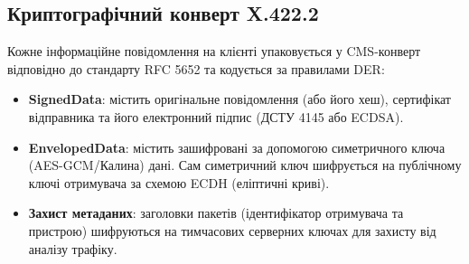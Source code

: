 \documentclass{article}
\begin{document}
\subsection{Криптографічний конверт X.422.2}
Кожне інформаційне повідомлення на клієнті упаковується у CMS-конверт відповідно до стандарту RFC 5652 та кодується за правилами DER:
\begin{itemize}
    \item \textbf{SignedData}: містить оригінальне повідомлення (або його хеш), сертифікат відправника та його електронний підпис (ДСТУ 4145 або ECDSA).
    \item \textbf{EnvelopedData}: містить зашифровані за допомогою симетричного ключа (AES-GCM/Калина) дані. Сам симетричний ключ шифрується на публічному ключі отримувача за схемою ECDH (еліптичні криві).
    \item \textbf{Захист метаданих}: заголовки пакетів (ідентифікатор отримувача та пристрою) шифруються на тимчасових серверних ключах для захисту від аналізу трафіку.
\end{itemize}
\end{document}
